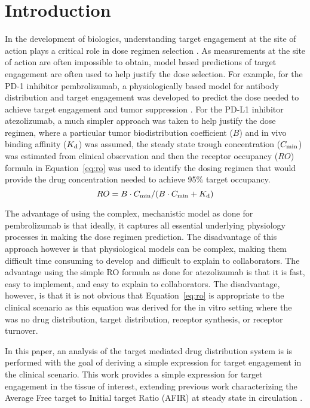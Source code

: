 \section{Introduction}
In the development of biologics, understanding target engagement at the site of action plays a critical role in dose regimen selection \cite{wang16}.  As measurements at the site of action are often impossible to obtain, model based predictions of target engagement are often used to help justify the dose selection.  For example, for the PD-1 inhibitor pembrolizumab, a physiologically based model for antibody distribution and target engagement was developed to predict the dose needed to achieve target engagement and tumor suppression \cite{lindauer17}.  For the PD-L1 inhibitor atezolizumab, a much simpler approach was taken to help justify the dose regimen, where a particular tumor biodistribution coefficient ($B$) and in vivo binding affinity ($K_\text{d}$) was assumed, the steady state trough concentration ($C_\text{min}$) was estimated from clinical observation and then the receptor occupancy ($RO$) formula in Equation~\ref{eq:ro} was used to identify the dosing regimen that would provide the drug concentration needed to achieve 95\% target occupancy.
\begin{equation}
RO = B\cdot C_\text{min}/(B\cdot C_\text{min}+K_\text{d})
\label{eq:ro}
\end{equation}

The advantage of using the complex, mechanistic model as done for pembrolizumab is that ideally, it captures all essential underlying physiology processes in making the dose regimen prediction.  The disadvantage of this approach however is that physiological models can be complex, making them difficult time consuming to develop and difficult to explain to collaborators.  The advantage using the simple RO formula as done for atezolizumab is that it is fast, easy to implement, and easy to explain to collaborators.  The disadvantage, however, is that it is not obvious that Equation~\ref{eq:ro} is appropriate to the clinical scenario as this equation was derived for the in vitro setting \cite{boeynaems80} where the was no drug distribution, target distribution, receptor synthesis, or receptor turnover.

In this paper, an analysis of the target mediated drug distribution system is is performed with the goal of deriving a simple expression for target engagement in the clinical scenario.  This work provides a simple expression for target engagement in the tissue of interest, extending previous work characterizing the Average Free target to Initial target Ratio (AFIR) at steady state in circulation \cite{stein17}.